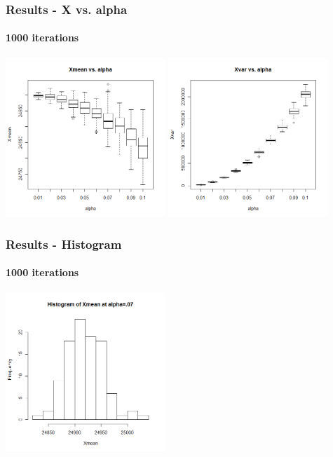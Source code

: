 \begin{frame}
    \frametitle{Results - X vs. alpha }
	\framesubtitle{1000 iterations}
\hspace*{-5mm}
\includegraphics[height=6cm]{boxplot1000_xmean_alpha}
\includegraphics[height=6cm]{boxplot1000_xvar_alpha}
\end{frame}

\begin{frame}
    \frametitle{Results - Histogram}
	\framesubtitle{1000 iterations}
\includegraphics[height=6cm]{hist1000_xmean_alpha07}
\end{frame}



